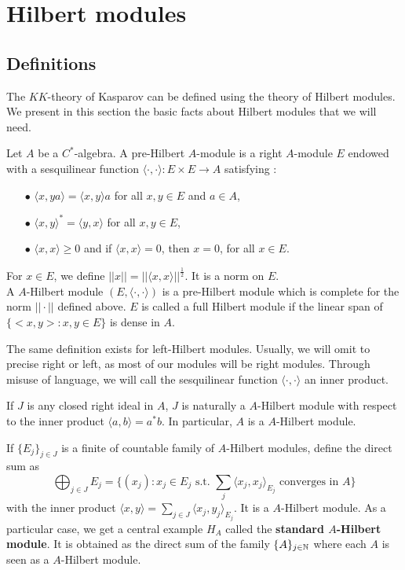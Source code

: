 \section{Hilbert modules}

\subsection{Definitions}

The $KK$-theory of Kasparov can be defined using the theory of Hilbert modules. We present in this section the basic facts about Hilbert modules that we will need.

\begin{definition}
Let $A$ be a $C^*$-algebra. A pre-Hilbert $A$-module is a right $A$-module $E$ endowed with a sesquilinear function $\langle\cdot, \cdot \rangle : E\times E \rightarrow A$ satisfying :
\begin{itemize}
\item[$\bullet$] $\langle x, ya\rangle = \langle x,y\rangle a $ for all $x,y\in E$ and $a\in A$,
\item[$\bullet$] $\langle x,y\rangle^* = \langle y,x\rangle$ for all $x,y\in E$,
\item[$\bullet$] $\langle x ,x\rangle \geq 0 $ and if $\langle x,x\rangle = 0$, then $x=0$, for all $x\in E$.
\end{itemize}
For $x\in E$, we define $||x|| = ||\langle x,x\rangle ||^{\frac{1}{2}}$. It is a norm on $E$.\cite{Lance}\\

A $A$-Hilbert module $(E,\langle \cdot,\cdot \rangle)$ is a pre-Hilbert module which is complete for the norm $||\cdot ||$ defined above. $E$ is called a full Hilbert module if the linear span of $\{ <x,y> : x,y\in E\}$ is dense in $A$.
\end{definition}

The same definition exists for left-Hilbert modules. Usually, we will omit to precise right or left, as most of our modules will be right modules. Through misuse of language, we will call the sesquilinear function $\langle \cdot,\cdot \rangle$ an inner product.

\begin{Expl} If $J$ is any closed right ideal in $A$, $J$ is naturally a $A$-Hilbert module with respect to the inner product $\langle a, b \rangle = a^* b$. In particular, $A$ is a $A$-Hilbert module.
\end{Expl}

\begin{Expl}
If $\{E_j\}_{j\in J}$ is a finite of countable family of $A$-Hilbert modules, define the direct sum as
\[\bigoplus_{j\in J} E_j = \{(x_j) : x_j\in E_j \text{ s.t. } \sum_j \langle x_j,x_j\rangle_{E_j} \text{ converges in } A\}\]
with the inner product $\langle x,y \rangle = \sum_{j\in J} \langle x_j, y_j\rangle_{E_j} $. It is a $A$-Hilbert module. As a particular case, we get a central example $H_A$ called the \textbf{standard $A$-Hilbert module}. It is obtained as the direct sum of the family $\{A\}_{j\in \mathbb N}$ where each $A$ is seen as a $A$-Hilbert module.
\end{Expl}

